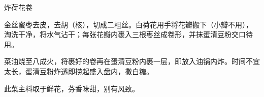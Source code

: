 %
%
%
%
%
%
%
\begin{recipe}{炸荷花卷}

\ingredients


\preparation

\step 金丝蜜枣去皮，去胡（核），切成二粗丝。白荷花用手将花瓣搬下（小瓣不用），
淘洗干净，将水气沾干；每张花瓣内裹入三根枣丝成卷形，并抹蛋清豆粉交口待用。

\step 菜油烧至八成火，将裹好的卷再在蛋清豆粉内裹一层，即放入油锅内炸。时间不宜
太长，蛋清豆粉炸透即捞起盛入盘内，撒白糖。

\features

此菜主料取于鲜花，芬香味甜，别有风致。

\end{recipe}

